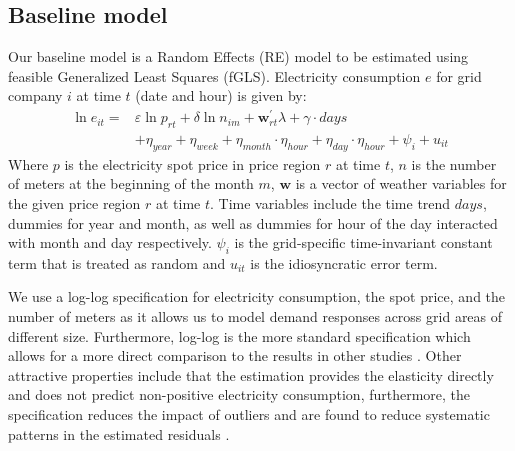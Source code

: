 \label{sec:empirical}
\subsection{Baseline model}
\label{subsec:model}
Our baseline model is a Random Effects (RE) model to be estimated using feasible Generalized Least Squares (fGLS). Electricity consumption $e$ for grid company $i$ at time $t$ (date and hour) is given by:
\begin{equation}
  \begin{split}
  \ln e_{it}=&\varepsilon\ln p_{rt}+\delta\ln n_{im}+\bm{w}^{'}_{rt}\lambda+\gamma\cdot days\\
  &+\eta_{year}+\eta_{week}+\eta_{month}\cdot\eta_{hour}+\eta_{day}\cdot\eta_{hour}+\psi_i+u_{it}
  \end{split}
  \label{eq:baseline}
\end{equation}
Where $p$ is the electricity spot price in price region $r$ at time $t$, $n$ is the number of meters at the beginning of the month $m$, $\bm{w}$ is a vector of weather variables for the given price region $r$ at time $t$. Time variables include the time trend $days$, dummies for year and month, as well as dummies for hour of the day interacted with month and day respectively. $\psi_i$ is the grid-specific time-invariant constant term that is treated as random and $u_{it}$ is the idiosyncratic error term.
\par
We use a log-log specification for electricity consumption, the spot price, and the number of meters as it allows us to model demand responses across grid areas of different size. Furthermore, log-log is the more standard specification which allows for a more direct comparison to the results in other studies \citep{burke2017price}. Other attractive properties include that the estimation provides the elasticity directly and does not predict non-positive electricity consumption, furthermore, the specification reduces the impact of outliers and are found to reduce systematic patterns in the estimated residuals \citep{burke2017price}. %
\par

